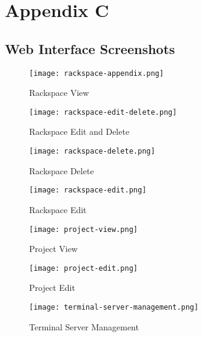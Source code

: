 \chapter{Appendix C}
\label{chap:appendix-c}
\section*{Web Interface Screenshots}

\begin{figure}[H]
    \centering
    \texttt{[image: rackspace-appendix.png]}
    \caption{Rackspace View}
    \label{fig:rackspace-view}
\end{figure}

\begin{figure}[H]
    \centering
    \texttt{[image: rackspace-edit-delete.png]}
    \caption{Rackspace Edit and Delete}
    \label{fig:rackspace-edit-delete}
\end{figure}

\begin{figure}[H]
    \centering
    \texttt{[image: rackspace-delete.png]}
    \caption{Rackspace Delete}
    \label{fig:rackspace-delete}
\end{figure}

\begin{figure}[H]
    \centering
    \texttt{[image: rackspace-edit.png]}
    \caption{Rackspace Edit}
    \label{fig:rackspace-edit}
\end{figure}

\begin{figure}[H]
    \centering
    \texttt{[image: project-view.png]}
    \caption{Project View}
    \label{fig:project-view}
\end{figure}

\begin{figure}[H]
    \centering
    \texttt{[image: project-edit.png]}
    \caption{Project Edit}
    \label{fig:project-edit}
\end{figure}

\begin{figure}[H]
    \centering
    \texttt{[image: terminal-server-management.png]}
    \caption{Terminal Server Management}
    \label{fig:terminal-server-management}
\end{figure}
